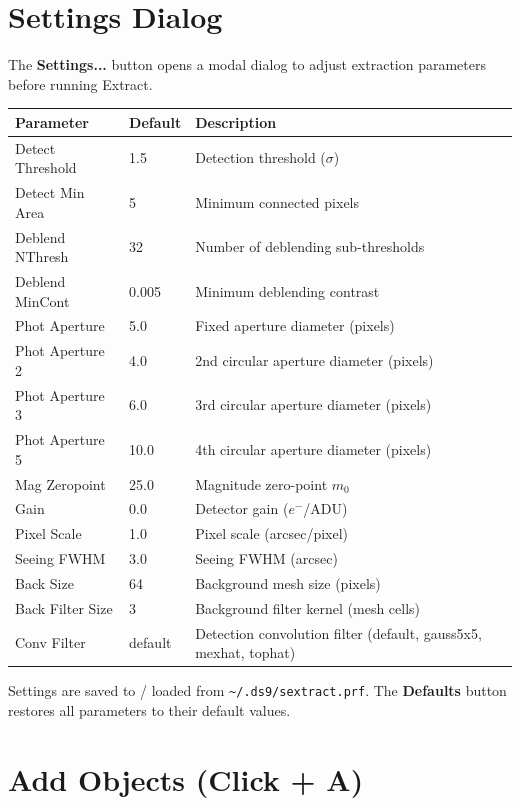 \documentclass[11pt,fleqn]{book}
\begin{document}
\section{Settings Dialog}

The \textbf{Settings...} button opens a modal dialog to adjust extraction parameters before running Extract.

\begin{center}
\begin{longtable}{L{4.0cm} C{1.8cm} L{6.5cm}}
\toprule
\textbf{Parameter} & \textbf{Default} & \textbf{Description} \\
\midrule
\endhead
Detect Threshold & 1.5 & Detection threshold ($\sigma$) \\
Detect Min Area & 5 & Minimum connected pixels \\
Deblend NThresh & 32 & Number of deblending sub-thresholds \\
Deblend MinCont & 0.005 & Minimum deblending contrast \\
Phot Aperture & 5.0 & Fixed aperture diameter (pixels) \\
Phot Aperture 2 & 4.0 & 2nd circular aperture diameter (pixels) \\
Phot Aperture 3 & 6.0 & 3rd circular aperture diameter (pixels) \\
Phot Aperture 5 & 10.0 & 4th circular aperture diameter (pixels) \\
Mag Zeropoint & 25.0 & Magnitude zero-point $m_0$ \\
Gain & 0.0 & Detector gain ($e^-$/ADU) \\
Pixel Scale & 1.0 & Pixel scale (arcsec/pixel) \\
Seeing FWHM & 3.0 & Seeing FWHM (arcsec) \\
Back Size & 64 & Background mesh size (pixels) \\
Back Filter Size & 3 & Background filter kernel (mesh cells) \\
Conv Filter & default & Detection convolution filter (default, gauss5x5, mexhat, tophat) \\
\bottomrule
\end{longtable}
\end{center}

Settings are saved to / loaded from \texttt{\textasciitilde/.ds9/sextract.prf}. The \textbf{Defaults} button restores all parameters to their default values.


\section{Add Objects (Click + A)}
\end{document}
